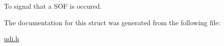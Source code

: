 \-To signal that a \-S\-O\-F is occured. 



\-The documentation for this struct was generated from the following file\-:\begin{DoxyCompactItemize}
\item 
\hyperlink{udi_8h}{udi.\-h}\end{DoxyCompactItemize}
